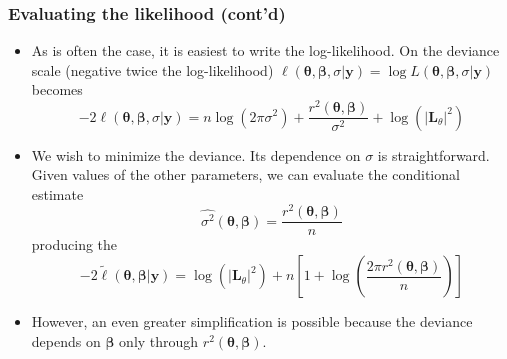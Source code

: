 \documentclass[dvipsnames,pdflatex,beamer]{beamer}
\begin{document}
\begin{frame}
  \frametitle{Evaluating the likelihood (cont'd)}
  \begin{itemize}
  \item As is often the case, it is easiest to write the
    log-likelihood.  On the deviance scale (negative twice the
    log-likelihood) $\ell(\bm\theta,\bm\beta,\sigma|\bm y)=\log
    L(\bm\theta,\bm\beta,\sigma|\bm y)$ becomes
    \begin{displaymath}
      -2\ell(\bm\theta,\bm\beta,\sigma|\bm y)=
      n\log(2\pi\sigma^2)+\frac{r^2(\bm\theta,\bm\beta)}{\sigma^2}+
      \log(|\bm L_\theta|^2)
    \end{displaymath}
  \item We wish to minimize the deviance.  Its dependence on $\sigma$
    is straightforward.  Given values of the other parameters, we can
    evaluate the conditional estimate
    \begin{displaymath}
      \widehat{\sigma^2}(\bm\theta,\bm\beta)=\frac{r^2(\bm\theta,\bm\beta)}{n}
    \end{displaymath}
    producing the 
    \begin{displaymath}
    -2\tilde{\ell}(\bm\theta,\bm\beta|\bm y)=\log(|\bm L_\theta|^2)+
      n\left[1+\log\left(\frac{2\pi r^2(\bm\theta,\bm\beta)}{n}\right)\right]
    \end{displaymath}
  \item However, an even greater simplification is possible because
    the deviance depends on $\bm\beta$ only through
    $r^2(\bm\theta,\bm\beta)$.
  \end{itemize}
\end{frame}
\end{document}
